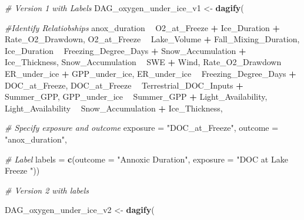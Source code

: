 \documentclass[]{article}
\newenvironment{Shaded}{\begin{snugshade}}{\end{snugshade}}
\newcommand{\CommentTok}[1]{\textcolor[rgb]{0.56,0.35,0.01}{\textit{#1}}}
\newcommand{\DataTypeTok}[1]{\textcolor[rgb]{0.13,0.29,0.53}{#1}}
\newcommand{\KeywordTok}[1]{\textcolor[rgb]{0.13,0.29,0.53}{\textbf{#1}}}
\newcommand{\NormalTok}[1]{#1}
\newcommand{\OperatorTok}[1]{\textcolor[rgb]{0.81,0.36,0.00}{\textbf{#1}}}
\newcommand{\StringTok}[1]{\textcolor[rgb]{0.31,0.60,0.02}{#1}}
\begin{document}
\begin{Shaded}
\begin{Highlighting}[]
\CommentTok{# Version 1 with Labels }
\NormalTok{    DAG_oxygen_under_ice_v1 <-}\StringTok{ }\KeywordTok{dagify}\NormalTok{(}
      
      \CommentTok{#Identify Relatiobships }
\NormalTok{      anox_duration }\OperatorTok{~}\StringTok{ }\NormalTok{O2_at_Freeze }\OperatorTok{+}\StringTok{ }\NormalTok{Ice_Duration }\OperatorTok{+}\StringTok{ }\NormalTok{Rate_O2_Drawdown,}
\NormalTok{      O2_at_Freeze }\OperatorTok{~}\StringTok{ }\NormalTok{Lake_Volume }\OperatorTok{+}\StringTok{ }\NormalTok{Fall_Mixing_Duration,}
\NormalTok{      Ice_Duration }\OperatorTok{~}\StringTok{ }\NormalTok{Freezing_Degree_Days }\OperatorTok{+}\StringTok{ }\NormalTok{Snow_Accumulation }\OperatorTok{+}\StringTok{ }\NormalTok{Ice_Thickness, }
\NormalTok{      Snow_Accumulation }\OperatorTok{~}\StringTok{ }\NormalTok{SWE }\OperatorTok{+}\StringTok{ }\NormalTok{Wind,}
\NormalTok{      Rate_O2_Drawdown }\OperatorTok{~}\StringTok{ }\NormalTok{ER_under_ice }\OperatorTok{+}\StringTok{ }\NormalTok{GPP_under_ice, }
\NormalTok{      ER_under_ice }\OperatorTok{~}\StringTok{ }\NormalTok{Freezing_Degree_Days }\OperatorTok{+}\StringTok{ }\NormalTok{DOC_at_Freeze,}
\NormalTok{      DOC_at_Freeze }\OperatorTok{~}\StringTok{ }\NormalTok{Terrestrial_DOC_Inputs }\OperatorTok{+}\StringTok{ }\NormalTok{Summer_GPP, }
\NormalTok{      GPP_under_ice }\OperatorTok{~}\StringTok{ }\NormalTok{Summer_GPP }\OperatorTok{+}\StringTok{ }\NormalTok{Light_Availability,}
\NormalTok{      Light_Availability }\OperatorTok{~}\StringTok{ }\NormalTok{Snow_Accumulation }\OperatorTok{+}\StringTok{ }\NormalTok{Ice_Thickness,}
    
      \CommentTok{# Specify exposure and outcome }
      \DataTypeTok{exposure =} \StringTok{"DOC_at_Freeze"}\NormalTok{, }
      \DataTypeTok{outcome =} \StringTok{"anox_duration"}\NormalTok{,}
      
      \CommentTok{# Label }
      \DataTypeTok{labels =} \KeywordTok{c}\NormalTok{(}\DataTypeTok{outcome =} \StringTok{"Annoxic Duration"}\NormalTok{,}
                 \DataTypeTok{exposure =} \StringTok{"DOC at Lake Freeze "}\NormalTok{))}


\CommentTok{# Version 2 with labels }

\NormalTok{    DAG_oxygen_under_ice_v2 <-}\StringTok{ }\KeywordTok{dagify}\NormalTok{(}
      

\end{Highlighting}
\end{Shaded}
\end{document}
